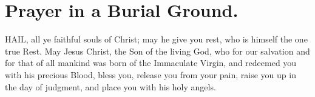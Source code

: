 \documentclass[a5paper,12pt]{memoir}
\begin{document}
\section{Prayer in a Burial Ground.}

HAIL, all ye faithful souls of 
Christ; may he give 
you rest, who is himself the one true Rest. 
May Jesus Christ, the 
Son of the living God, 
who for our salvation 
and for that of all 
mankind was born of 
the Immaculate Virgin, and redeemed 
you with his precious 
Blood, bless you, release you from your 
pain, raise you up in 
the day of judgment, 
and place you with 
his holy angels. 
\end{document}
